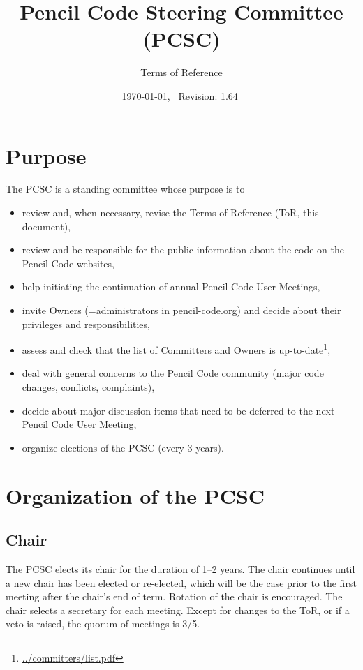 \documentclass{article}
\title{Pencil Code Steering Committee (PCSC)}
\author{Terms of Reference}
\date{\small\today,~ $ $Revision: 1.64 $ $}
\begin{document}
\maketitle

\section{Purpose}

The PCSC is a standing committee whose purpose is to
\begin{itemize}\itemsep-2pt
\item
review and, when necessary, revise the Terms of Reference
(ToR, this document),

\item
review and be responsible for the public information about the code
on the {\sc Pencil Code} websites,

\item
help initiating the continuation of annual {\sc Pencil Code} User Meetings,

\item
invite Owners (=administrators in pencil-code.org)
and decide about their privileges and responsibilities,

\item
assess and check that the list of Committers and Owners is up-to-date\footnote{
\url{../committers/list.pdf}},

\item
deal with general concerns to the {\sc Pencil Code} community
(major code changes, conflicts, complaints),

\item
decide about major discussion items that need to be deferred to the next
Pencil Code User Meeting,

\item
organize elections of the PCSC (every 3 years).

\end{itemize}

\section{Organization of the PCSC}

\subsection{Chair}

The PCSC elects its chair for the duration of 1--2 years.
The chair continues
until a new chair has been elected or re-elected, which will
be the case prior to the first meeting after the chair's end of term.
Rotation of the chair is encouraged.
The chair selects a secretary for each meeting.
Except for changes to the ToR, or if a veto is raised, the quorum of meetings is 3/5.
\end{document}
